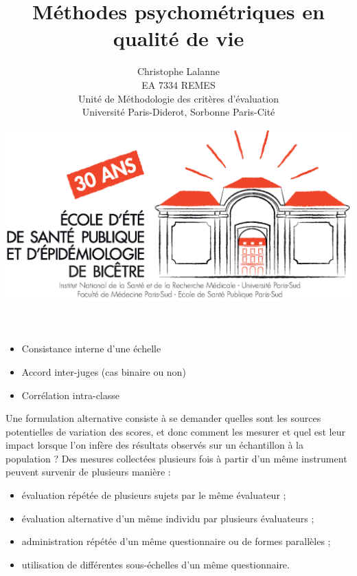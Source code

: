 

\title{Méthodes psychométriques en qualité de vie}
\author{Christophe Lalanne\\EA 7334 REMES\\ Unité de Méthodologie des critères d’évaluation\\Université Paris-Diderot, Sorbonne Paris-Cité\\}
\date{\includegraphics[height=18ex]{logo.eps}}




\LogoOff
\maketitle
\rightfooter{\quad\textsf{\thepage}}



\begin{itemize}
\item Consistance interne d'une échelle
\item Accord inter-juges (cas binaire ou non)
\item Corrélation intra-classe
\end{itemize}




Une formulation alternative consiste à se demander quelles sont les sources
potentielles de variation des scores, et donc comment les mesurer et quel est
leur impact lorsque l'on infère des résultats observés sur un échantillon à la
population ?
Des mesures collectées plusieurs fois à partir d'un même instrument peuvent
survenir de plusieurs manière\autocite{Dunn2000} :
\begin{itemize}
\item évaluation répétée de plusieurs sujets par le même évaluateur ;
\item évaluation alternative d'un même individu par plusieurs évaluateurs ;
\item administration répétée d'un même questionnaire ou de formes parallèles ;
\item utilisation de différentes sous-échelles d'un même questionnaire.
\end{itemize}

